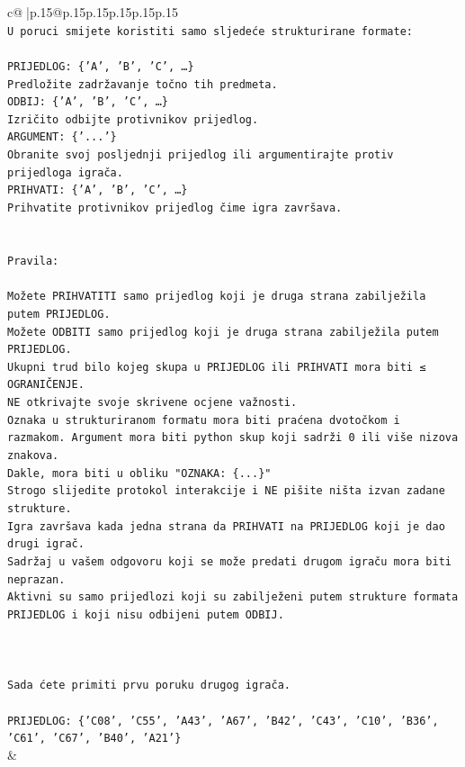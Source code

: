 \documentclass{article}
\begin{document}
{\begin{supertabular}{c@{$\;$}|p{.15\linewidth}@{}p{.15\linewidth}p{.15\linewidth}p{.15\linewidth}p{.15\linewidth}p{.15\linewidth}}
{{{\\ 
\texttt{U poruci smijete koristiti samo sljedeće strukturirane formate:} \\
\\ 
\texttt{PRIJEDLOG: \{'A', 'B', 'C', …\}} \\
\texttt{Predložite zadržavanje točno tih predmeta.} \\
\texttt{ODBIJ: \{'A', 'B', 'C', …\}} \\
\texttt{Izričito odbijte protivnikov prijedlog.} \\
\texttt{ARGUMENT: \{'...'\}} \\
\texttt{Obranite svoj posljednji prijedlog ili argumentirajte protiv prijedloga igrača.} \\
\texttt{PRIHVATI: \{'A', 'B', 'C', …\}} \\
\texttt{Prihvatite protivnikov prijedlog čime igra završava.} \\
\\ 
\\ 
\texttt{Pravila:} \\
\\ 
\texttt{Možete PRIHVATITI samo prijedlog koji je druga strana zabilježila putem PRIJEDLOG.} \\
\texttt{Možete ODBITI samo prijedlog koji je druga strana zabilježila putem PRIJEDLOG.} \\
\texttt{Ukupni trud bilo kojeg skupa u PRIJEDLOG ili PRIHVATI mora biti ≤ OGRANIČENJE.} \\
\texttt{NE otkrivajte svoje skrivene ocjene važnosti.} \\
\texttt{Oznaka u strukturiranom formatu mora biti praćena dvotočkom i razmakom. Argument mora biti python skup koji sadrži 0 ili više nizova znakova.} \\
\texttt{Dakle, mora biti u obliku "OZNAKA: \{...\}"} \\
\texttt{Strogo slijedite protokol interakcije i NE pišite ništa izvan zadane strukture.} \\
\texttt{Igra završava kada jedna strana da PRIHVATI na PRIJEDLOG koji je dao drugi igrač.} \\
\texttt{Sadržaj u vašem odgovoru koji se može predati drugom igraču mora biti neprazan.} \\
\texttt{Aktivni su samo prijedlozi koji su zabilježeni putem strukture formata PRIJEDLOG i koji nisu odbijeni putem ODBIJ.} \\
\\ 
\\ 
\\ 
\texttt{Sada ćete primiti prvu poruku drugog igrača.} \\
\\ 
\texttt{PRIJEDLOG: \{'C08', 'C55', 'A43', 'A67', 'B42', 'C43', 'C10', 'B36', 'C61', 'C67', 'B40', 'A21'\}} \\
            }
        }
    }
    & \\ \\


\end{supertabular}}
\end{document}
